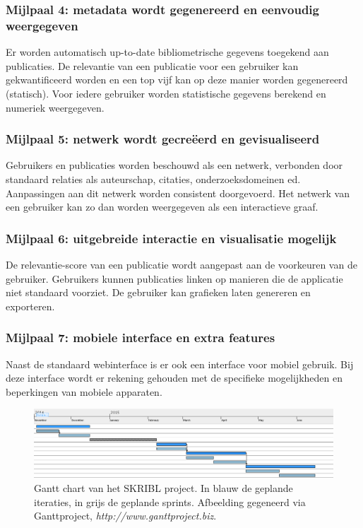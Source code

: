 \documentclass{article}
\begin{document}
\subsubsection*{Mijlpaal 4: metadata wordt gegenereerd en eenvoudig weergegeven}
Er worden automatisch up-to-date bibliometrische gegevens toegekend aan publicaties.
De relevantie van een publicatie voor een gebruiker kan gekwantificeerd worden en een top vijf kan op deze manier worden gegenereerd (statisch).
Voor iedere gebruiker worden statistische gegevens berekend en numeriek weergegeven.

\subsubsection*{Mijlpaal 5: netwerk wordt gecre\"{e}erd en gevisualiseerd}
Gebruikers en publicaties worden beschouwd als een netwerk, verbonden door standaard relaties als auteurschap, citaties, onderzoeksdomeinen ed. Aanpassingen aan dit netwerk worden consistent doorgevoerd.
Het netwerk van een gebruiker kan zo dan worden weergegeven als een interactieve graaf.

\subsubsection*{Mijlpaal 6: uitgebreide interactie en visualisatie mogelijk}
De relevantie-score van een publicatie wordt aangepast aan de voorkeuren van de gebruiker.
Gebruikers kunnen publicaties linken op manieren die de applicatie niet standaard voorziet.
De gebruiker kan grafieken laten genereren en exporteren.

\subsubsection*{Mijlpaal 7: mobiele interface en extra features}
Naast de standaard webinterface is er ook een interface voor mobiel gebruik. Bij deze interface wordt er rekening gehouden met de specifieke mogelijkheden en beperkingen van mobiele apparaten. \newline
\\

\begin{figure}[h!]
 \includegraphics[width=150mm]{gantt_cropped.png}
 \caption{Gantt chart van het SKRIBL project. In blauw de geplande iteraties, in grijs de geplande sprints. \small{Afbeelding gegeneerd via Ganttproject, \emph{http://www.ganttproject.biz}}.}
 \label{GanttChart}
\end{figure}
\end{document}

